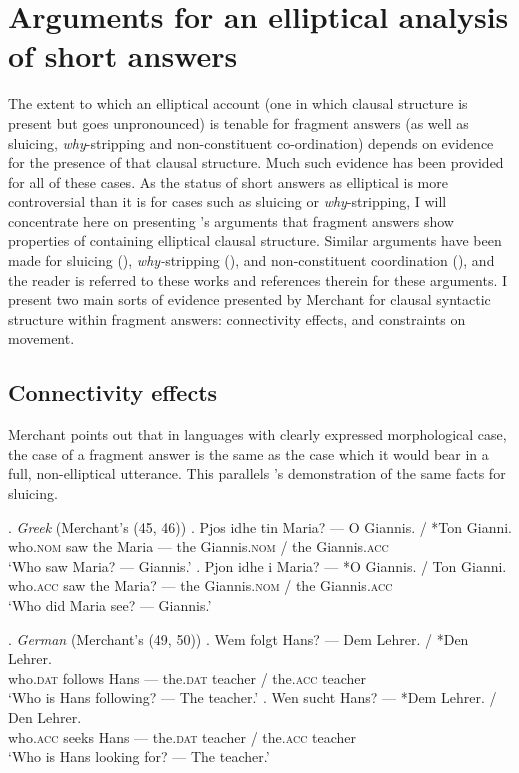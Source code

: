 \documentclass[doublespace]{umthesis}
\begin{document}
\section{Arguments for an elliptical analysis of short answers}\label{sec-Merchant-account}

The extent to which an elliptical account (one in which clausal structure is present but goes unpronounced) is tenable for fragment answers (as well as sluicing, {\it why}-stripping and non-constituent co-ordination) depends on evidence for the presence of that clausal structure. Much such evidence has been provided for all of these cases. As the status of short answers as elliptical is more controversial than it is for cases such as sluicing or {\it why}-stripping, I will concentrate here on presenting \cite{Me04}'s arguments that fragment answers show properties of containing elliptical clausal structure. Similar arguments have been made for sluicing (\cite{Ro69, Me01}), {\it why-}stripping (\cite{NYO12}), and non-constituent coordination (\cite{ST13}), and the reader is referred to these works and references therein for these arguments. I present two main sorts of evidence presented by Merchant for clausal syntactic structure within fragment answers: connectivity effects, and constraints on movement.

\subsection{Connectivity effects}

Merchant points out that in languages with clearly expressed morphological case, the case of a fragment answer is the same as the case which it would bear in a full, non-elliptical utterance. This parallels \cite{Ro69}'s demonstration of the same facts for sluicing.

\ex. 		{\it Greek} (Merchant's (45, 46))
		\ag. Pjos idhe tin Maria? --- O Giannis. / *Ton Gianni. \\
			who.\textsc{nom} saw the Maria --- the Giannis.\textsc{nom} / the Giannis.\textsc{acc} \\
			`Who saw Maria? --- Giannis.'
		\bg. Pjon idhe i Maria? --- *O Giannis. / Ton Gianni. \\
			who.\textsc{acc} saw the Maria? --- the Giannis.\textsc{nom} / the Giannis.\textsc{acc} \\
			`Who did Maria see? --- Giannis.'
			
\ex. 		\label{german-case-connectivity}{\it German} (Merchant's (49, 50))
		\ag. Wem folgt Hans? --- Dem Lehrer. / *Den Lehrer. \\
			who.\textsc{dat} follows Hans --- the.\textsc{dat} teacher / the.\textsc{acc} teacher \\
			`Who is Hans following? --- The teacher.'
		\bg. Wen sucht Hans? --- *Dem Lehrer. / Den Lehrer. \\
			who.\textsc{acc} seeks Hans --- the.\textsc{dat}  teacher / the.\textsc{acc} teacher \\
			`Who is Hans looking for? --- The teacher.'
			
\end{document}

